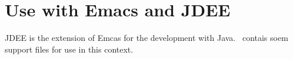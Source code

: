 \section{Use with Emacs and JDEE}

JDEE is the extension of Emcas for the development with Java. \ExTeX\
contais soem support files for use in this context.

\INCOMPLETE


